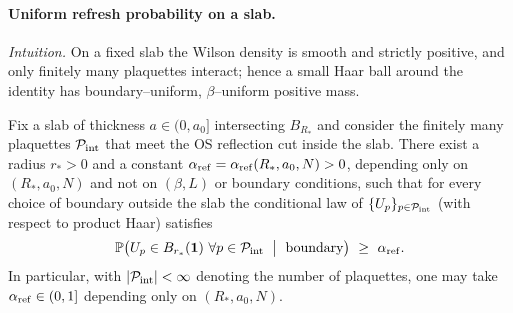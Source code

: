 \documentclass[11pt]{amsart}
\begin{document}
\paragraph{Uniform refresh probability on a slab.}
\emph{Intuition.} On a fixed slab the Wilson density is smooth and strictly positive, and only finitely many plaquettes interact; hence a small Haar ball around the identity has boundary–uniform, $\beta$–uniform positive mass.
\begin{lemma}\label{lem:refresh-prob}
Fix a slab of thickness $a\in(0,a_0]$ intersecting $B_{R_*}$ and consider the finitely many plaquettes $\mathcal P_{\rm int}$ that meet the OS reflection cut inside the slab. There exist a radius $r_*>0$ and a constant $\alpha_{\rm ref}=\alpha_{\rm ref}(R_*,a_0,N)>0$, depending only on $(R_*,a_0,N)$ and not on $(\beta,L)$ or boundary conditions, such that for every choice of boundary outside the slab the conditional law of $\{U_p\}_{p\in\mathcal P_{\rm int}}$ (with respect to product Haar) satisfies
\[
  \mathbb P\big( U_p\in B_{r_*}(\mathbf 1)\ \forall p\in\mathcal P_{\rm int}\ \bigm|\ \text{boundary}\big)\ \ge\ \alpha_{\rm ref}.
\]
In particular, with $|\mathcal P_{\rm int}|<\infty$ denoting the number of plaquettes, one may take $\alpha_{\rm ref}\in(0,1]$ depending only on $(R_*,a_0,N)$.
\end{lemma}
\end{document}
